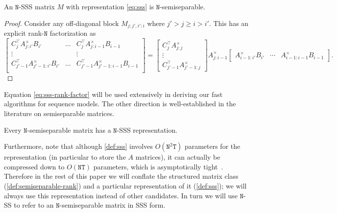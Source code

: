 \begin{lemma}
  \label{lmm:sss-rank-factor}
  An $\mathtt{N}$-SSS matrix $M$ with representation \eqref{eq:sss} is $\mathtt{N}$-semiseparable.
\end{lemma}
\begin{proof}
  Consider any off-diagonal block $M_{j:j', i':i}$ where $j' > j \ge i > i'$.
  This has an explicit rank-$\mathtt{N}$ factorization as
  \begin{equation}
    \label{eq:sss-rank-factor}
    \begin{bmatrix}
      C_j^{\top} A_{j:i'}^\times B_{i'}         & \dots & C_j^{\top} A_{j:i-1}^\times B_{i-1}   \\
      \vdots                                    &       &       \vdots      \\
      C_{j'-1}^{\top} A_{j'-1:i'}^\times B_{i'} & \dots & C_{j'-1}^{\top} A_{j'-1:i-1}^\times B_{i-1} \\
    \end{bmatrix}
    =
    \begin{bmatrix} C_j^{\top} A_{j:j}^\times \\ \vdots \\ C_{j'-1}^{\top} A_{j'-1:j}^\times \end{bmatrix}
    A_{j:i-1}^\times
    \begin{bmatrix} A_{i-1:i'}^\times B_{i'} & \cdots & A_{i-1:i-1}^\times B_{i-1} \end{bmatrix}
    .
  \end{equation}
\end{proof}
Equation \eqref{eq:sss-rank-factor} will be used extensively in deriving our fast algorithms for sequence models.
The other direction is well-established in the literature on semiseparable matrices.

\begin{proposition}
  \label{prop:sss}
  Every $\mathtt{N}$-semiseparable matrix has a $\mathtt{N}$-SSS representation.
\end{proposition}
Furthermore, note that although \cref{def:sss} involves $O(\mathtt{N}^2\mathtt{T})$ parameters for the representation (in particular to store the $A$ matrices),
it can actually be compressed down to $O(\mathtt{NT})$ parameters, which is asymptotically tight~\citep{pernet2023exact}.
Therefore in the rest of this paper we will conflate the structured matrix class (\cref{def:semiseparable-rank}) and a particular representation of it (\cref{def:sss}); we will always use this representation instead of other candidates.
In turn we will use $\mathtt{N}$-SS to refer to an $\mathtt{N}$-semiseparable matrix in SSS form.

